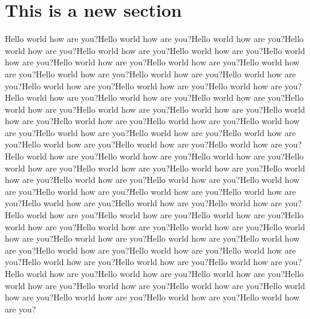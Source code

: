 \section{This is a new section}
Hello world how are you?Hello world how are you?Hello world how are you?Hello world how are you?Hello world how are you?Hello world how are you?Hello world how are you?Hello world how are you?Hello world how are you?Hello world how are you?Hello world how are you?Hello world how are you?Hello world how are you?Hello world how are you?Hello world how are you?Hello world how are you?Hello world how are you?Hello world how are you?Hello world how are you?Hello world how are you?Hello world how are you?Hello world how are you?Hello world how are you?Hello world how are you?Hello world how are you?Hello world how are you?Hello world how are you?Hello world how are you?Hello world how are you?Hello world how are you?Hello world how are you?Hello world how are you?Hello world how are you?Hello world how are you?Hello world how are you?Hello world how are you?Hello world how are you?Hello world how are you?Hello world how are you?Hello world how are you?Hello world how are you?Hello world how are you?Hello world how are you?Hello world how are you?Hello world how are you?Hello world how are you?Hello world how are you?Hello world how are you?Hello world how are you?Hello world how are you?Hello world how are you?Hello world how are you?Hello world how are you?Hello world how are you?Hello world how are you?Hello world how are you?Hello world how are you?Hello world how are you?Hello world how are you?Hello world how are you?Hello world how are you?Hello world how are you?Hello world how are you?Hello world how are you?Hello world how are you?Hello world how are you?Hello world how are you?Hello world how are you?Hello world how are you?Hello world how are you?Hello world how are you?Hello world how are you?Hello world how are you?Hello world how are you?
